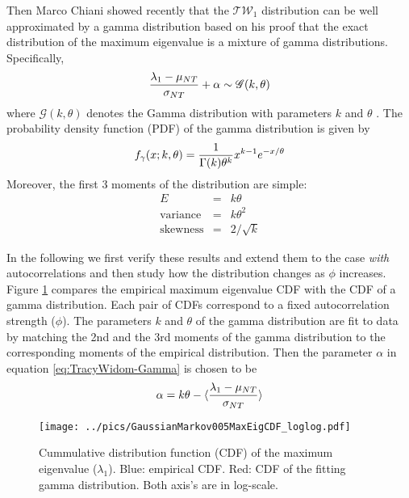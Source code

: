 \documentclass{book}
\begin{document}
Then Marco Chiani showed recently that the $\mathscr{TW}_1$ distribution
can be well approximated by a gamma distribution based on his proof
that the exact distribution of the maximum eigenvalue is a mixture of
gamma distributions. Specifically,
\begin{equation}\label{eq:TracyWidom-Gamma}
  {\lambda_1 - \mu_{NT} \over \sigma_{NT}} + \alpha \sim
  \mathscr{G}(k ,\theta)
\end{equation}
where $\mathscr{G}(k, \theta)$ denotes the Gamma distribution with
parameters $k$ and $\theta$ \cite{Chiani2012}. The probability
density function (PDF) of the gamma distribution is given by
\begin{equation*}
  f_\gamma(x; k, \theta) = {1 \over \Gamma(k) \theta^k} x^{k-1}
  e^{-x/\theta}
\end{equation*}
Moreover, the first 3 moments of the distribution are simple:
\begin{eqnarray*}
  E &=& k\theta \\
  \text{variance} &=& k\theta^2 \\
  \text{skewness} &=& 2/\sqrt{k}
\end{eqnarray*}

In the following we first verify these results and extend them to the
case {\it with} autocorrelations and then study how the
distribution changes as $\phi$ increases. Figure
\ref{fig:GaussianMarkov005MaxEigCDF_loglog} compares the empirical
maximum eigenvalue CDF with the CDF of a gamma distribution. Each pair
of CDFs correspond to a fixed autocorrelation strength ($\phi$). The
parameters $k$ and $\theta$ of the gamma distribution are fit to
data by matching the 2nd and the 3rd moments of the gamma distribution
to the corresponding moments of the empirical distribution. Then the
parameter $\alpha$ in equation \ref{eq:TracyWidom-Gamma} is chosen to
be
\begin{equation*}
  \alpha = k\theta - \langle{\lambda_1 - \mu_{NT} \over \sigma_{NT}}\rangle
\end{equation*}

\begin{figure}
  \begin{center}
    \texttt{[image: ../pics/GaussianMarkov005MaxEigCDF\_loglog.pdf]}
    \label{fig:GaussianMarkov005MaxEigCDF_loglog}
    \caption{\footnotesize Cummulative distribution function (CDF) of the maximum
      eigenvalue ($\lambda_1$). Blue: empirical CDF. Red: CDF of the
      fitting gamma distribution. Both axis's are in log-scale.}
  \end{center}
  \vspace{-10mm}
\end{figure}
\end{document}
